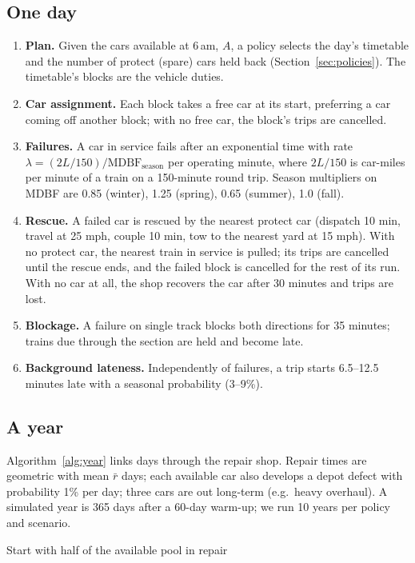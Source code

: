 \documentclass[11pt]{article}
\begin{document}
\subsection{One day}
\begin{enumerate}
\item \textbf{Plan.} Given the cars available at 6\,am, $A$, a policy selects the day's timetable and the number of protect (spare) cars held back (Section~\ref{sec:policies}). The timetable's blocks are the vehicle duties.
\item \textbf{Car assignment.} Each block takes a free car at its start, preferring a car coming off another block; with no free car, the block's trips are cancelled.
\item \textbf{Failures.} A car in service fails after an exponential time with rate $\lambda=(2L/150)/\text{MDBF}_{\text{season}}$ per operating minute, where $2L/150$ is car-miles per minute of a train on a 150-minute round trip. Season multipliers on MDBF are 0.85 (winter), 1.25 (spring), 0.65 (summer), 1.0 (fall).
\item \textbf{Rescue.} A failed car is rescued by the nearest protect car (dispatch 10 min, travel at 25 mph, couple 10 min, tow to the nearest yard at 15 mph). With no protect car, the nearest train in service is pulled; its trips are cancelled until the rescue ends, and the failed block is cancelled for the rest of its run. With no car at all, the shop recovers the car after 30 minutes and trips are lost.
\item \textbf{Blockage.} A failure on single track blocks both directions for 35 minutes; trains due through the section are held and become late.
\item \textbf{Background lateness.} Independently of failures, a trip starts 6.5--12.5 minutes late with a seasonal probability (3--9\%).
\end{enumerate}

\subsection{A year}
Algorithm~\ref{alg:year} links days through the repair shop. Repair times are geometric with mean $\bar r$ days; each available car also develops a depot defect with probability 1\% per day; three cars are out long-term (e.g.\ heavy overhaul). A simulated year is 365 days after a 60-day warm-up; we run 10 years per policy and scenario.

\begin{algorithm}[ht]
\caption{One simulated year}\label{alg:year}
Start with half of the available pool in repair\;
\end{algorithm}
\end{document}
